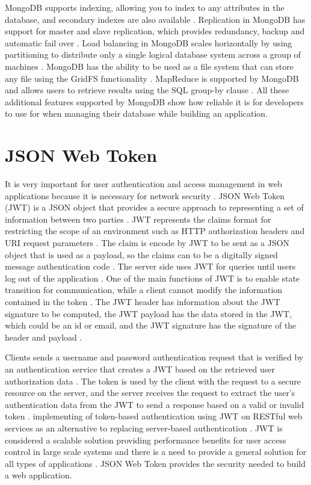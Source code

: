 MongoDB supports indexing, allowing you to index to any attributes in the database, and secondary indexes are also available \cite{zhao2013modeling}. Replication in MongoDB has support for master and slave replication, which provides redundancy, backup and automatic fail over \cite{zhao2013modeling}. Load balancing in MongoDB scales horizontally by using partitioning to distribute only a single logical database system across a group of machines \cite{zhao2013modeling}. MongoDB has the ability to be used as a file system that can store any file using the GridFS functionality \cite{zhao2013modeling}. MapReduce is supported by MongoDB and allows users to retrieve results using the SQL group-by clause \cite{zhao2013modeling}. All these additional features supported by MongoDB show how reliable it is for developers to use for when managing their database while building an application.

\section{JSON Web Token}
It is very important for user authentication and access management in web applications because it is necessary for network security \cite{ahmed2019authentication}. JSON Web Token (JWT) is a JSON object that provides a secure approach to representing a set of information between two parties \cite{ahmed2019authentication}. JWT represents the claims format for restricting the scope of an environment such as HTTP authorization headers and URI request parameters \cite{haekal2016token}. The claim is encode by JWT to be sent as a JSON object that is used as a payload, so the claims can to be a digitally signed message authentication code \cite{haekal2016token}. The server side uses JWT for queries until users log out of the application \cite{ahmed2019authentication}. One of the main functions of JWT is to enable state transition for communication, while a client cannot modify the information contained in the token \cite{ahmed2019authentication}. The JWT header has information about the JWT signature to be computed, the JWT payload has the data stored in the JWT, which could be an id or email, and the JWT signature has the signature of the header and payload \cite{ahmed2019authentication}.

Clients sends a username and password authentication request that is verified by an authentication service that creates a JWT based on the retrieved user authorization data \cite{ahmed2019authentication}. The token is used by the client with the request to a secure resource on the server, and the server receives the request to extract the user's authentication data from the JWT to send a response based on a valid or invalid token \cite{ahmed2019authentication}. implementing of token-based authentication using JWT on RESTful web services as an alternative to replacing server-based authentication \cite{haekal2016token}. JWT is considered a scalable solution providing performance benefits for user access control in large scale systems and there is a need to provide a general solution for all types of applications \cite{ahmed2019authentication}. JSON Web Token provides the security needed to build a web application.

